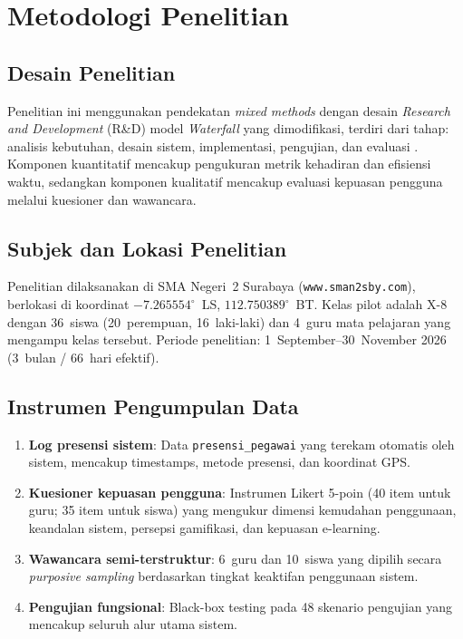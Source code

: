 \documentclass[12pt,a4paper]{article}
\begin{document}
\section{Metodologi Penelitian}
\label{sec:method}

\subsection{Desain Penelitian}

Penelitian ini menggunakan pendekatan \textit{mixed methods} dengan
desain \textit{Research and Development} (R\&D) model
\textit{Waterfall} yang dimodifikasi, terdiri dari tahap:
analisis kebutuhan, desain sistem, implementasi, pengujian, dan evaluasi
\citep{pressman2014software}.
Komponen kuantitatif mencakup pengukuran metrik kehadiran dan efisiensi
waktu, sedangkan komponen kualitatif mencakup evaluasi kepuasan
pengguna melalui kuesioner dan wawancara.

\subsection{Subjek dan Lokasi Penelitian}

Penelitian dilaksanakan di SMA Negeri~2 Surabaya
(\texttt{www.sman2sby.com}), berlokasi di koordinat
$-7.265554^\circ$~LS, $112.750389^\circ$~BT.
Kelas pilot adalah X-8 dengan 36~siswa (20~perempuan, 16~laki-laki)
dan 4~guru mata pelajaran yang mengampu kelas tersebut.
Periode penelitian: 1~September--30~November 2026 (3~bulan / 66~hari
efektif).

\subsection{Instrumen Pengumpulan Data}

\begin{enumerate}
  \item \textbf{Log presensi sistem}: Data \texttt{presensi\_pegawai}
        yang terekam otomatis oleh sistem, mencakup timestamps, metode
        presensi, dan koordinat GPS.
  \item \textbf{Kuesioner kepuasan pengguna}: Instrumen Likert 5-poin
        (40 item untuk guru; 35 item untuk siswa) yang mengukur dimensi
        kemudahan penggunaan, keandalan sistem, persepsi gamifikasi,
        dan kepuasan e-learning.
  \item \textbf{Wawancara semi-terstruktur}: 6~guru dan 10~siswa yang
        dipilih secara \textit{purposive sampling} berdasarkan tingkat
        keaktifan penggunaan sistem.
  \item \textbf{Pengujian fungsional}: Black-box testing pada 48
        skenario pengujian yang mencakup seluruh alur utama sistem.
\end{enumerate}
\end{document}
